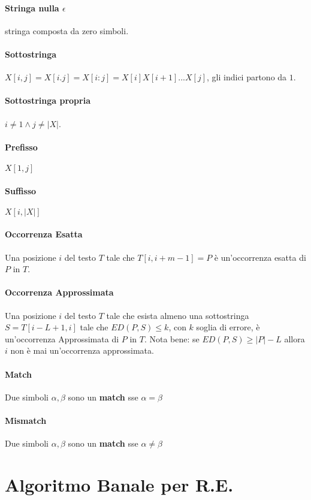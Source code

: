 \paragraph{Stringa nulla $\epsilon$} stringa composta da zero simboli.
\paragraph{Sottostringa} $X[i,j] = X[i.j] = X[i:j] = X[i]X[i+1]...X[j]$, gli indici partono da $1$.
\paragraph{Sottostringa propria} $i \neq 1 \land j \neq |X|$.
\paragraph{Prefisso} $X[1,j]$
\paragraph{Suffisso} $X[i,|X|]$

\paragraph{Occorrenza Esatta} Una posizione $i$ del testo $T$ tale che $T[i, i+m-1] = P$ \`e un'occorrenza esatta di $P$ in $T$.
\paragraph{Occorrenza Approssimata} Una posizione $i$ del testo $T$ tale che esista almeno una sottostringa $S = T[i-L+1, i]$ tale che $ED(P, S) \leq k$, con $k$ soglia di errore, \`e un'occorrenza Approssimata di $P$ in $T$.
Nota bene: se $ED(P, S) \geq |P| - L$ allora $i$ non \`e mai un'occorrenza approssimata.

\paragraph{Match} Due simboli $\alpha,\beta$ sono un \textbf{match} sse $\alpha = \beta$
\paragraph{Mismatch} Due simboli $\alpha,\beta$ sono un \textbf{match} sse $\alpha \neq \beta$

\section{Algoritmo Banale per R.E.}

